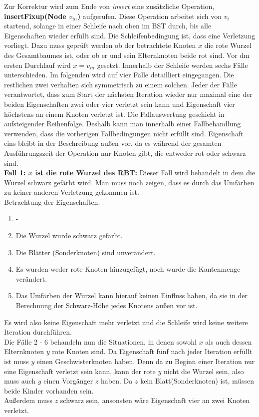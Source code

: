 \documentclass[a4paper,12pt]{article}
\begin{document}
\noindent Zur Korrektur wird zum Ende von \textit{insert} eine zusätzliche Operation, \textbf{insertFixup(Node $v_{in}$)} aufgerufen. Diese Operation arbeitet sich von $v_i$ startend, solange in einer Schleife nach oben im BST durch, bis alle Eigenschaften wieder erfüllt sind. Die Schleifenbedingung ist, dass eine Verletzung vorliegt. Dazu muss geprüft werden ob der betrachtete Knoten $x$ die rote Wurzel des Gesamtbaumes ist, oder ob er und sein Elternknoten beide rot sind. Vor dm ersten Durchlauf wird $x = v_{in}$ gesetzt. Innerhalb der Schleife werden sechs Fälle unterschieden. Im folgenden wird auf vier Fälle detailliert eingegangen. Die restlichen zwei verhalten sich symmetrisch zu einem solchen. Jeder der Fälle verantwortet, dass zum Start der nächsten Iteration wieder nur maximal eine der beiden Eigenschaften zwei oder vier verletzt sein kann und Eigenschaft vier höchstens an einem Knoten verletzt ist. Die Fallauswertung geschieht in aufsteigender Reihenfolge. Deshalb kann man innerhalb einer Fallbehandlung verwenden, dass die vorherigen Fallbedingungen nicht erfüllt sind. Eigenschaft eins bleibt in der Beschreibung außen vor, da es während der gesamten Ausführungszeit der Operation nur Knoten gibt, die entweder rot oder schwarz sind. \\

\noindent\textbf{Fall 1: $x$ ist die rote Wurzel des RBT: }
Dieser Fall wird behandelt in dem die Wurzel schwarz gefärbt wird. Man muss noch zeigen, dass es durch das Umfärben zu keiner anderen Verletzung gekommen ist.\\

Betrachtung der Eigenschaften:
\begin{enumerate}
	\item -
	\item Die Wurzel wurde schwarz gefärbt.
	\item Die Blätter (Sonderknoten) sind unverändert.
	\item Es wurden weder rote Knoten hinzugefügt, noch wurde die Kantenmenge verändert. 
	\item Das Umfärben der Wurzel kann hierauf keinen Einfluss haben, da sie in der Berechnung der Schwarz-Höhe jedes Knotens außen vor ist.
\end{enumerate}  

\noindent Es wird also keine Eigenschaft mehr verletzt und die Schleife wird keine weitere Iteration durchführen.\\
Die Fälle 2 - 6 behandeln nun die Situationen, in denen sowohl $x$ als auch dessen Elternknoten $y$ rote Knoten sind. Da Eigenschaft fünf nach jeder Iteration erfüllt ist muss $y$ einen Geschwisterknoten haben. Denn da zu Beginn einer Iteration nur eine Eigenschaft verletzt sein kann, kann der rote $y$ nicht die Wurzel sein, also muss auch $y$ einen Vorgänger $z$ haben. Da $z$ kein Blatt(Sonderknoten) ist, müssen beide Kinder vorhanden sein.\\
Außerdem muss $z$ schwarz sein, ansonsten wäre Eigenschaft vier an zwei Knoten verletzt.\\
\end{document}
